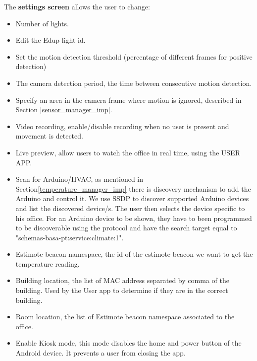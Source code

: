 The \textbf{settings screen} allows the user to change:
\begin{itemize}
  \item Number of lights.
  \item Edit the Edup light id.
  
  \item Set the motion detection threshold (percentage of different frames for positive detection)
  
  \item The camera detection period, the time between consecutive motion detection.
  
  \item Specify an area in the camera frame where motion is ignored, described in Section \ref{sensor_manager_imp}. 
  
  \item Video recording, enable/disable recording when no user is present and movement is detected.
  
  \item Live preview, allow users to watch the office in real time, using the USER APP.
  
  \item Scan for Arduino/HVAC, as mentioned in Section\ref{temperature_manager_imp} there is discovery mechanism to add the Arduino and control it. We use \ac{SSDP} to discover supported Arduino devices and list the discovered device/s. The user then selects the device specific to his office.
  For an Arduino device to be shown, they have to been programmed to be discoverable using the protocol and have the search target equal to "schemas-basa-pt:service:climate:1".
  
  \item Estimote beacon namespace, the id of the estimote beacon we want to get the temperature reading.
  
  \item Building location, the list of \ac{MAC address} separated by comma of the building. Used by the User app to determine if they are in the correct building.
  
  \item Room location, the list of Estimote beacon namespace associated to the office.
  
  
  \item Enable Kiosk mode, this mode disables the home and power button of the Android device. It prevents a user from closing the app. 
    
  
\end{itemize}

